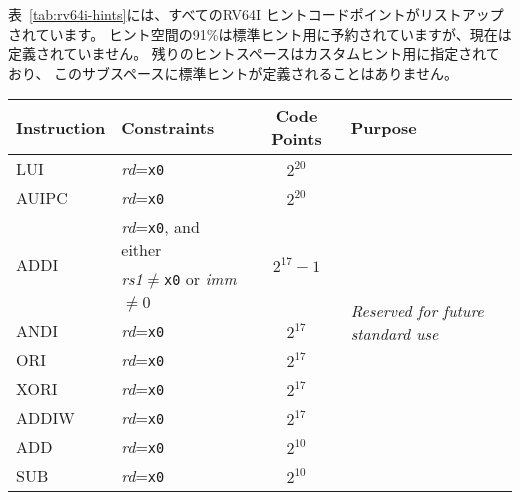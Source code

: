 \begin{comment}
Table~\ref{tab:rv64i-hints} lists all RV64I HINT code points.  91\% of the HINT
space is reserved for standard HINTs, but none are presently defined.  The
remainder of the HINT space is designated for custom HINTs; no standard HINTs
will ever be defined in this subspace.
\end{comment}

表~\ref{tab:rv64i-hints}には、すべてのRV64I ヒントコードポイントがリストアップされています。
ヒント空間の91\%は標準ヒント用に予約されていますが、現在は定義されていません。
残りのヒントスペースはカスタムヒント用に指定されており、
このサブスペースに標準ヒントが定義されることはありません。

\begin{table}[hbt]
\centering
\begin{tabular}{|l|l|c|l|}
  \hline
  Instruction           & Constraints                                 & Code Points & Purpose \\ \hline \hline
  LUI                   & {\em rd}={\tt x0}                           & $2^{20}$                    & \multirow{32}{*}{\em Reserved for future standard use} \\ \cline{1-3}
  AUIPC                 & {\em rd}={\tt x0}                           & $2^{20}$                    & \\ \cline{1-3}
  \multirow{2}{*}{ADDI} & {\em rd}={\tt x0}, and either               & \multirow{2}{*}{$2^{17}-1$} & \\
                        & {\em rs1}$\neq${\tt x0} or {\em imm}$\neq$0 &                             & \\ \cline{1-3}
  ANDI                  & {\em rd}={\tt x0}                           & $2^{17}$                    & \\ \cline{1-3}
  ORI                   & {\em rd}={\tt x0}                           & $2^{17}$                    & \\ \cline{1-3}
  XORI                  & {\em rd}={\tt x0}                           & $2^{17}$                    & \\ \cline{1-3}
  ADDIW                 & {\em rd}={\tt x0}                           & $2^{17}$                    & \\ \cline{1-3}
  ADD                   & {\em rd}={\tt x0}                           & $2^{10}$                    & \\ \cline{1-3}
  SUB                   & {\em rd}={\tt x0}                           & $2^{10}$                    & \\ \cline{1-3}

\end{tabular}
\end{table}
